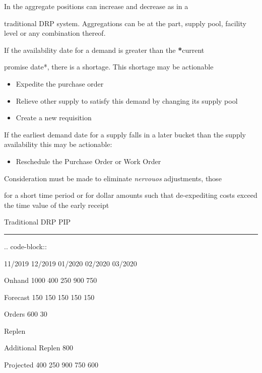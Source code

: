 \documentclass[letterpaper,10pt,english]{sphinxmanual}
\begin{document}
\begin{DUlineblock}{0em}
\item[] In the aggregate positions can increase and decrease as in a
\end{DUlineblock}

traditional DRP system. Aggregations can
\textbar{} be at the part, supply pool, facility level or any combination
thereof.

\begin{DUlineblock}{0em}
\item[] If the availability date for a demand is greater than the {\color{red}\bfseries{}*}current
\end{DUlineblock}

promise date*, there is a shortage. This shortage
\textbar{} may be actionable
\begin{itemize}
\item {} 
Expedite the purchase order

\item {} 
Relieve other supply to satisfy this demand by changing its supply
pool

\item {} 
Create a new requisition

\end{itemize}

If the earliest demand date for a supply falls in a later bucket than
the supply availability this may be actionable:
\begin{itemize}
\item {} 
Reschedule the Purchase Order or Work Order

\end{itemize}

\begin{DUlineblock}{0em}
\item[] Consideration must be made to eliminate \emph{nervouos} adjustments, those
\end{DUlineblock}

for a short time period or for dollar amounts
\textbar{} such that de-expediting costs exceed the time value of the early
receipt

Traditional DRP PIP


\bigskip\hrule{}\bigskip


\begin{DUlineblock}{0em}
\item[] .. code-block::
\item[] 11/2019 12/2019 01/2020 02/2020 03/2020
\item[] Onhand 1000 400 250 900 750
\item[] Forecast 150 150 150 150 150
\item[] Orders 600 30
\item[] Replen
\item[] Additional Replen 800
\item[] Projected 400 250 900 750 600
\end{DUlineblock}
\end{document}
